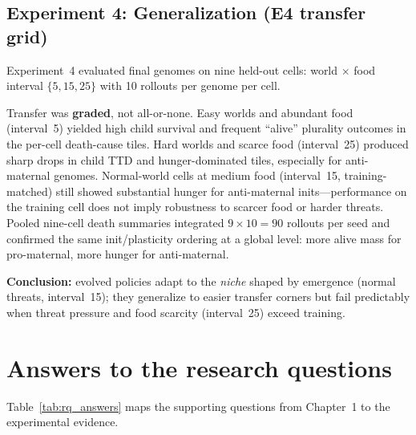 \subsection{Experiment 4: Generalization (E4 transfer grid)}
Experiment~4 evaluated final genomes on nine held-out cells: world $\times$ food interval $\{5,15,25\}$ with 10 rollouts per genome per cell.

Transfer was \textbf{graded}, not all-or-none.
Easy worlds and abundant food (interval~5) yielded high child survival and frequent ``alive'' plurality outcomes in the per-cell death-cause tiles.
Hard worlds and scarce food (interval~25) produced sharp drops in child TTD and hunger-dominated tiles, especially for anti-maternal genomes.
Normal-world cells at medium food (interval~15, training-matched) still showed substantial hunger for anti-maternal inits---performance on the training cell does not imply robustness to scarcer food or harder threats.
Pooled nine-cell death summaries integrated $9\times 10=90$ rollouts per seed and confirmed the same init/plasticity ordering at a global level: more alive mass for pro-maternal, more hunger for anti-maternal.

\textbf{Conclusion:} evolved policies adapt to the \emph{niche} shaped by emergence (normal threats, interval~15); they generalize to easier transfer corners but fail predictably when threat pressure and food scarcity (interval~25) exceed training.

\section{Answers to the research questions}

Table~\ref{tab:rq_answers} maps the supporting questions from Chapter~1 to the experimental evidence.

